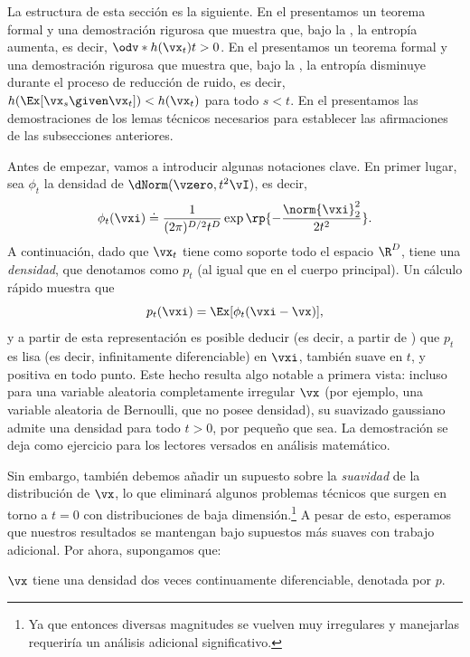 \documentclass[../../book-main_es.tex]{subfiles}
\begin{document}
La estructura de esta sección es la siguiente. En el
 presentamos un teorema formal
y una demostración rigurosa que muestra que, bajo la
, la entropía aumenta,
es decir, \(\odv*{h(\vx_{t})}{t} > 0\). En el
 presentamos un teorema formal
y una demostración rigurosa que muestra que, bajo la
, la entropía disminuye
durante el proceso de reducción de ruido, es decir, \(h(\Ex[\vx_{s} \given \vx_{t}]) <
h(\vx_{t})\) para todo \(s < t\). En el
 presentamos las demostraciones de
los lemas técnicos necesarios para establecer las afirmaciones de las
subsecciones anteriores.

Antes de empezar, vamos a introducir algunas notaciones clave. En primer lugar, sea
\(\phi_{t}\) la densidad de \(\dNorm(\vzero, t^{2}\vI)\), es decir,
\begin{equation}\label{eq:gaussian_noise_time_t}
    \phi_{t}(\vxi) \doteq
    \frac{1}{(2\pi)^{D/2}t^{D}}\exp\rp{-\frac{\norm{\vxi}_{2}^{2}}{2t^{2}}}.
\end{equation}
A continuación, dado que \(\vx_{t}\) tiene como soporte todo el espacio \(\R^{D}\), tiene una
\textit{densidad}, que denotamos como \(p_{t}\) (al igual que en el cuerpo principal). Un
cálculo rápido muestra que
\begin{equation}\label{eq:p_t_representation}
    p_{t}(\vxi) = \Ex[\phi_{t}(\vxi - \vx)],
\end{equation}
y a partir de esta representación es posible deducir (es decir, a partir de
) que \(p_{t}\) es lisa (es decir,
infinitamente diferenciable) en \(\vxi\), también suave en \(t\), y
positiva en todo punto. Este hecho resulta algo notable a primera vista:
incluso para una variable aleatoria completamente irregular \(\vx\) (por ejemplo, una
variable aleatoria de Bernoulli, que no posee densidad), su
suavizado gaussiano admite una densidad para todo \(t
> 0\), por pequeño que sea. La demostración se deja como ejercicio para los lectores versados en
análisis matemático.

Sin embargo, también debemos añadir un supuesto sobre la
\textit{suavidad} de la distribución de \(\vx\), lo que
eliminará algunos problemas técnicos que surgen en torno a \(t = 0\) con
distribuciones de baja dimensión.\footnote{Ya que entonces diversas magnitudes
    se vuelven muy irregulares y manejarlas requeriría
un análisis adicional significativo.} A pesar de esto, esperamos que nuestros
resultados se mantengan bajo supuestos más suaves con trabajo adicional. Por ahora,
supongamos que:
\begin{assumption}\label{assumption:entropy_x_density}
    \(\vx\) tiene una densidad dos veces continuamente diferenciable, denotada por \(p\).
\end{assumption}
\end{document}

